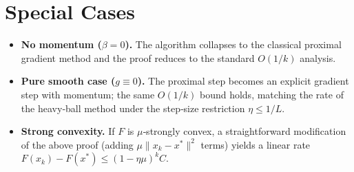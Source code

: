 \documentclass{article}
\begin{document}
\section*{Special Cases}
\begin{itemize}
    \item \textbf{No momentum ($\beta=0$).} The algorithm collapses to the classical proximal gradient method and the proof reduces to the standard $O(1/k)$ analysis.
    \item \textbf{Pure smooth case ($g\equiv0$).} The proximal step becomes an explicit gradient step with momentum; the same $O(1/k)$ bound holds, matching the rate of the heavy‑ball method under the step‑size restriction $\eta\le1/L$.
    \item \textbf{Strong convexity.} If $F$ is $\mu$‑strongly convex, a straightforward modification of the above proof (adding $\mu\|x_{k}-x^{*}\|^{2}$ terms) yields a linear rate $F(x_{k})-F(x^{*})\le (1-\eta\mu)^{k}C$.
\end{itemize}
\end{document}
